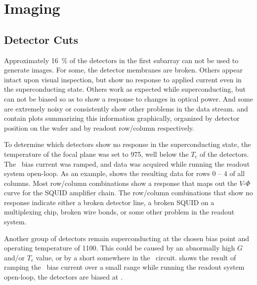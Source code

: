 \chapter{Imaging}\label{c:imaging}

\section{Detector Cuts} \label{sec:ch8-det-cuts}

Approximately \SI{16}{\percent} of the detectors in the first subarray can not be used to generate images.
For some, the detector membranes are broken.
Others appear intact upon visual inspection, but show no response to applied current even in the superconducting state.
Others work as expected while superconducting, but can not be biased so as to show a response to changes in optical power. 
And some are extremely noisy or consistently show other problems in the data stream.
 and  contain plots summarizing this information graphically, organized by detector position on the wafer and by readout row/column respectively.

To determine which detectors show no response in the superconducting state, the temperature of the focal plane was set to \SI{975}{\mK}, well below the $T_c$ of the detectors.
The \TES\ bias current was ramped, and data was acquired while running the readout system open-loop.
As an example,  shows the resulting data for rows 0 -- 4 of all columns.
Most row/column combinations show a response that maps out the $V$-$\Phi$ curve for the SQUID amplifier chain.
The row/column combinations that show no response indicate either a broken detector line, a broken SQUID on a multiplexing chip, broken wire bonds, or some other problem in the readout system.

Another group of detectors remain superconducting at the chosen bias point and operating temperature of \SI{1100}{\mK}.
This could be caused by an abnormally high $G$ and/or $T_c$ value, or by a short somewhere in the \TES\ circuit.
 shows the result of ramping the \TES\ bias current over a small range while running the readout system open-loop, the detectors are biased at \SOC.

